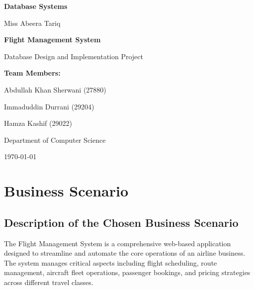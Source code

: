 \documentclass[12pt,a4paper,openany]{report}
\begin{document}
\begin{titlepage}
    \centering
    \vspace*{2cm}
    
    {\LARGE\bfseries Database Systems\par}
    \vspace{1cm}
    {\Large Miss Abeera Tariq\par}
    \vspace{2cm}
    
    {\Huge\bfseries Flight Management System\par}
    \vspace{0.5cm}
    {\Large Database Design and Implementation Project\par}
    \vspace{3cm}
    
    {\Large\bfseries Team Members:\par}
    \vspace{0.5cm}
    {\large
    Abdullah Khan Sherwani (27880)\par
    \vspace{0.3cm}
    Immaduddin Durrani (29204)\par
    \vspace{0.3cm}
    Hamza Kashif (29022)\par
    }
    
    \vfill
    
    {\large Department of Computer Science\par}
    {\large \today\par}
\end{titlepage}

\tableofcontents
\newpage

\chapter{Business Scenario}

\section{Description of the Chosen Business Scenario}
The Flight Management System is a comprehensive web-based application designed to streamline and automate the core operations of an airline business. The system manages critical aspects including flight scheduling, route management, aircraft fleet operations, passenger bookings, and pricing strategies across different travel classes.
\end{document}
